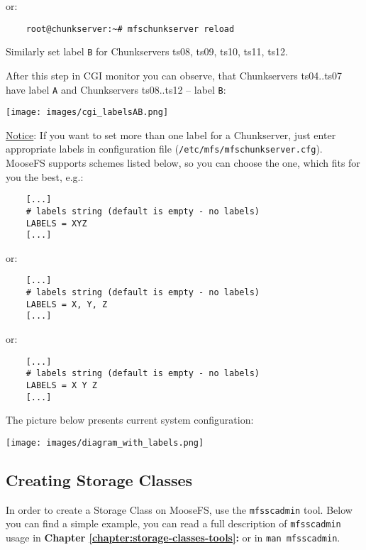 \documentclass[a4paper,11pt,english]{report}
\def\code#1{\texttt{#1}}
\begin{document}
			or:
			\begin{lstlisting}
	root@chunkserver:~# mfschunkserver reload
			\end{lstlisting}
			
	
			Similarly set label \code{B} for Chunkservers ts08, ts09, ts10, ts11, ts12.		
			
			After this step in CGI monitor you can observe, that Chunkservers ts04..ts07 have label \code{A} and Chunkservers ts08..ts12 -- label \code{B}:
			
			\bigskip
			\texttt{[image: images/cgi\_labelsAB.png]}
	
			\bigskip
					
			\underline{Notice}: If you want to set more than one label for a Chunkserver, just enter appropriate labels in configuration file (\code{/etc/mfs/mfschunkserver.cfg}). MooseFS supports schemes listed below, so you can choose the one, which fits for you the best, e.g.:
			
			\bigskip
			
			\begin{lstlisting}
	[...]
	# labels string (default is empty - no labels)
	LABELS = XYZ
	[...]
			\end{lstlisting}
			
			or:
			
			\begin{lstlisting}
	[...]
	# labels string (default is empty - no labels)
	LABELS = X, Y, Z
	[...]
			\end{lstlisting}
			
			or:
			
			\begin{lstlisting}
	[...]
	# labels string (default is empty - no labels)
	LABELS = X Y Z
	[...]
			\end{lstlisting}
			
			\bigskip
			
			The picture below presents current system configuration:			
			\bigskip
	
			\texttt{[image: images/diagram\_with\_labels.png]}
	
			\pagebreak
			
			\subsection{Creating Storage Classes}
			
			In order to create a Storage Class on MooseFS, use the \code{mfsscadmin} tool. Below you can find a simple example, you can read a full description of \code{mfsscadmin} usage in \textbf{Chapter \ref{chapter:storage-classes-tools}:  } or in \code{man mfsscadmin}.
			
\end{document}
